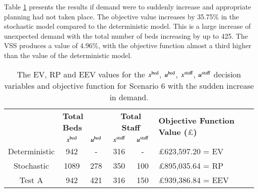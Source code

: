 \documentclass[../thesis.tex]{subfiles}
\begin{document}
Table \ref{tab:Scenario7Results} presents the results if demand were to suddenly increase and appropriate planning had not taken place. The objective value increases by 35.75\% in the stochastic model compared to the deterministic model. This is a large increase of unexpected demand with the total number of beds increasing by up to 425. The VSS produces a value of 4.96\%, with the objective function almost a third higher than the value of the deterministic model. 
\begin{table}[h!]
    \centering
    \begin{tabular}{cccccl}\toprule
 & \multicolumn{2}{l}{\textbf{Total Beds}} & \multicolumn{2}{c}{\textbf{Total Staff}} & \multirow{2}{*}{\textbf{Objective Function Value ($\pounds$)}}\\ \cmidrule(lr){2-3} \cmidrule(lr){4-5}
         
 & $x^\textnormal{bed}$           & $u^\textnormal{bed}$          & $x^\textnormal{staff}$         & $u^\textnormal{staff}$         \\ \midrule
 Deterministic & 942  & - & 316 & - &$\pounds$623,597.20 = EV \\
 Stochastic & 1089& 278 & 350 & 100 & $\pounds$895,035.64 = RP \\
 Test A & 942 & 421 & 316 &  150 & $\pounds$939,386.84 = EEV \\\bottomrule
    \end{tabular}
    \caption{The EV, RP and EEV values for the $x^\textnormal{bed}$, $u^\textnormal{bed}$, $x^\textnormal{staff}$, $u^\textnormal{staff}$ decision variables and objective function for Scenario 6 with the sudden increase in demand.}
    \label{tab:Scenario7Results}
\end{table}
\end{document}
